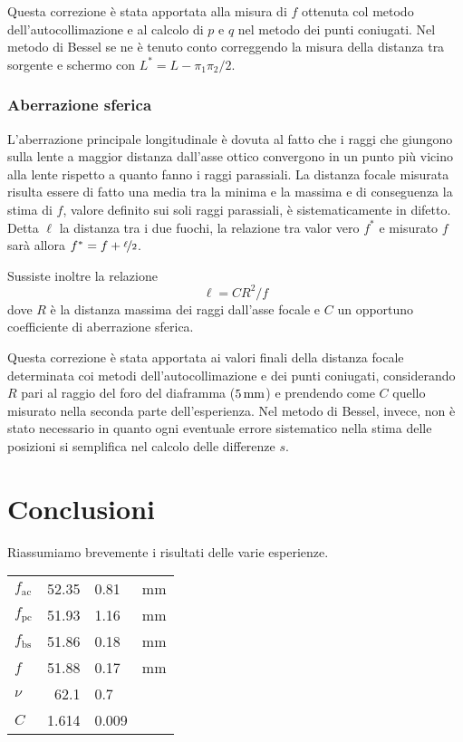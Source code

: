 \documentclass[italian,a4paper]{article}
\begin{document}
Questa correzione è stata apportata alla misura di $f$ ottenuta col metodo dell'autocollimazione e al calcolo di $p$ e $q$ nel metodo dei punti coniugati. Nel metodo di Bessel se ne è tenuto conto correggendo la misura della distanza tra sorgente e schermo con $L^*=L-{\pi_1\pi_2}/{2}$.
\subsubsection*{Aberrazione sferica}
L'aberrazione principale longitudinale è dovuta al fatto che i raggi che giungono sulla lente a maggior distanza dall'asse ottico convergono in un punto più vicino alla lente rispetto a quanto fanno i raggi parassiali. La distanza focale misurata risulta essere di fatto una media tra la minima e la massima e di conseguenza la stima di $f$, valore definito sui soli raggi parassiali, è sistematicamente in difetto.
Detta $\ell$ la distanza tra i due fuochi, la relazione tra valor vero $f^*$ e misurato $f$ sarà allora $f^*=f+\nicefrac{\ell}{2}$.

Sussiste inoltre la relazione $$\ell=C{R^2}/{f}$$ dove $R$ è la distanza massima dei raggi dall'asse focale e $C$ un opportuno coefficiente di aberrazione sferica.

Questa correzione è stata apportata ai valori finali della distanza focale determinata coi metodi dell'autocollimazione e dei punti coniugati, considerando $R$ pari al raggio del foro del diaframma ($\unit[5]{mm}$) e prendendo come $C$ quello misurato nella seconda parte dell'esperienza. Nel metodo di Bessel, invece, non è stato necessario in quanto ogni eventuale errore sistematico nella stima delle posizioni si semplifica nel calcolo delle differenze $s$.
\section{Conclusioni}
Riassumiamo brevemente i risultati delle varie esperienze.
\begin{table}[h]
\centering
 \begin{tabular}{l@{$\,=\,$}r@{$\,\pm\,$}ll}
$f_{\text{ac}}$ &52.35 &0.81 &\unit{mm}\\
$f_{\text{pc}}$ &51.93 &1.16 &\unit{mm}\\
$f_{\text{bs}}$ &51.86 &0.18 &\unit{mm}\\
$f$ &51.88 &0.17 &\unit{mm} \\[.5cm]
$\nu$ &62.1 &0.7 & \\
$C$ &1.614 &0.009 & \\
\end{tabular}
\end{table}
\end{document}
